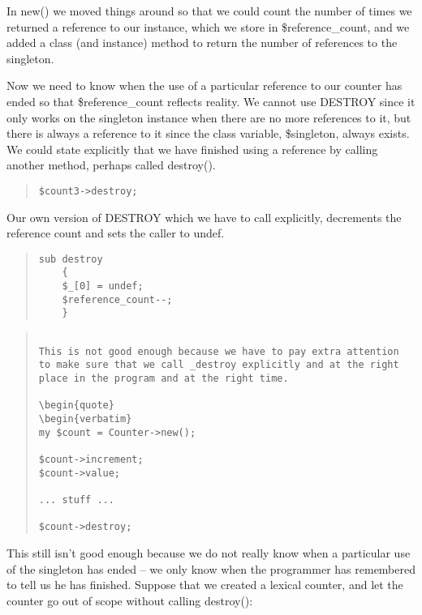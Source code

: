 In new() we moved things around so that we could count the number
of times we returned a reference to our instance, which we store
in \$reference\_count, and we added a class (and instance) method to return 
the number of references to the singleton. 

Now we need to know when the use of a particular reference to our counter has ended so that
\$reference\_count reflects reality.  We cannot use DESTROY since it 
only works on the singleton instance
when there are no more references to it, but there is always a 
reference to it since the class variable, \$singleton, always exists. We could
state explicitly that we have finished using a reference by calling another
method, perhaps called destroy().

\begin{quote}    
\begin{verbatim}
$count3->destroy;
\end{verbatim}
\end{quote}    

Our own version of DESTROY which we have to call explicitly, 
decrements the reference count and sets the caller to undef.

\begin{quote}    
\begin{verbatim}
sub destroy
    {
    $_[0] = undef;
    $reference_count--;
    }
\end{verbatim}
\end{quote}    

\begin{quote}    
\begin{verbatim}

This is not good enough because we have to pay extra attention
to make sure that we call _destroy explicitly and at the right
place in the program and at the right time.

\begin{quote}    
\begin{verbatim}
my $count = Counter->new();

$count->increment;
$count->value;

... stuff ...

$count->destroy;
\end{verbatim}
\end{quote}    


This still isn't good enough because we do not really know
when a particular use of the singleton has ended -- we only
know when the programmer has remembered to tell us he has
finished.  Suppose that we created a lexical counter, and
let the counter go out of scope without calling destroy():

